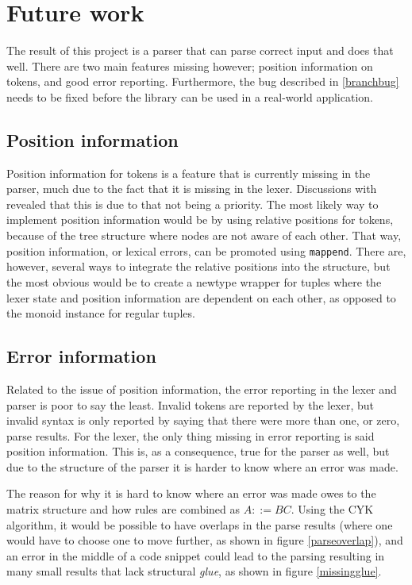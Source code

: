 \documentclass[a4paper,12pt,notitlepage]{report}
\begin{document}
\section{Future work}
\label{futurework}
The result of this project is a parser that can parse correct input and does
that well. There are two main features missing however; position information on
tokens, and good error reporting. Furthermore, the bug described in
\ref{branchbug} needs to be fixed before the library can be used in a real-world
application.

\subsection{Position information}
Position information for tokens is a feature that is currently missing in the
parser, much due to the fact that it is missing in the lexer. Discussions with
\citeauthor{divconqlex} revealed that this is due to that not being a priority.
The most likely way to implement position information would be by using relative
positions for tokens, because of the tree structure where nodes are not aware of
each other. That way, position information, or lexical errors, can be promoted
using \texttt{mappend}. There are, however, several ways to integrate the
relative positions into the structure, but the most obvious would be to create a
newtype wrapper for tuples where the lexer state and position information are
dependent on each other, as opposed to the monoid instance for regular tuples. 

\subsection{Error information}
Related to the issue of position information, the error reporting in the lexer
and parser is poor to say the least. Invalid tokens are reported by the lexer,
but invalid syntax is only reported by saying that there were more than one, or
zero, parse results. For the lexer, the only thing missing in error reporting is
said position information. This is, as a consequence, true for the parser as
well, but due to the structure of the parser it is harder to know where an error
was made.

The reason for why it is hard to know where an error was made owes to the matrix
structure and how rules are combined as $A ::= BC$. Using the CYK algorithm, it
would be possible to have overlaps in the parse results (where one would have to
choose one to move further, as shown in figure \ref{parseoverlap}), and an error
in the middle of a code snippet could lead to the parsing resulting in many
small results that lack structural \textit{glue}, as shown in figure
\ref{missingglue}. 
\end{document}
